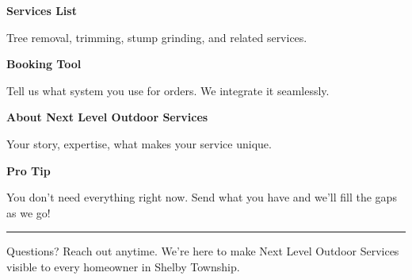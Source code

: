 \documentclass[11pt,letterpaper]{article}
\begin{document}
\begin{minipage}[t]{0.48\textwidth}
\begin{tcolorbox}[colframe=accent-teal, boxrule=1pt, left=0.7em, right=0.7em, top=0.5em, bottom=0.5em, arc=4pt, boxsep=0pt]
{\bfseries\small\color{accent-teal}Services List}

\vspace{0.15em}

{\small Tree removal, trimming, stump grinding, and related services.}
\end{tcolorbox}

\vspace{0.1em}

\begin{tcolorbox}[colframe=accent-teal, boxrule=1pt, left=0.7em, right=0.7em, top=0.5em, bottom=0.5em, arc=4pt, boxsep=0pt]
{\bfseries\small\color{accent-teal}Booking Tool}

\vspace{0.15em}

{\small Tell us what system you use for orders. We integrate it seamlessly.}
\end{tcolorbox}

\vspace{0.1em}

\begin{tcolorbox}[colframe=accent-teal, boxrule=1pt, left=0.7em, right=0.7em, top=0.5em, bottom=0.5em, arc=4pt, boxsep=0pt]
{\bfseries\small\color{accent-teal}About Next Level Outdoor Services}

\vspace{0.15em}

{\small Your story, expertise, what makes your service unique.}
\end{tcolorbox}

\vspace{-0.2em}
\end{minipage}

\vspace{0.15em}

\begin{tcolorbox}[colback={accent-red!5}, colframe=accent-red!20, boxrule=0.5pt, left=0.7em, right=0.7em, top=0.4em, bottom=0.4em, arc=6pt, boxsep=0pt]

{\bfseries\small\color{accent-red}Pro Tip}

\vspace{0.1em}

{\small You don't need everything right now. Send what you have and we'll fill the gaps as we go!}

\end{tcolorbox}

\vspace{0.15em}

\noindent\hrule
\vspace{0.2em}

{\small\color{text-light}Questions? Reach out anytime. We're here to make Next Level Outdoor Services visible to every homeowner in Shelby Township.}
\end{document}
